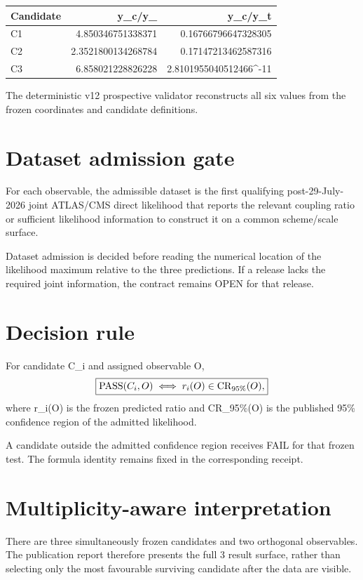 \documentclass[11pt,a4paper,twoside]{book}
\def\({}%
\def\){}%
\theoremstyle{definition}
\begin{document}
\begin{center}
\begin{tabular}{lrr}
\toprule
Candidate & \(y_c/y_\mu\) & \(y_c/y_t\)\\
\midrule
C1 & 4.850346751338371 & 0.16766796647328305\\
C2 & 2.3521800134268784 & 0.17147213462587316\\
C3 & 6.858021228826228 & \(2.8101955040512466\times10^{-11}\)\\
\bottomrule
\end{tabular}
\end{center}

The deterministic v12 prospective validator reconstructs all six values from
the frozen coordinates and candidate definitions.

\section{Dataset admission gate}

For each observable, the admissible dataset is the first qualifying
post-29-July-2026 joint ATLAS/CMS direct likelihood that reports the relevant
coupling ratio or sufficient likelihood information to construct it on a common
scheme/scale surface.

Dataset admission is decided before reading the numerical location of the
likelihood maximum relative to the three predictions.  If a release lacks the
required joint information, the contract remains OPEN for that release.

\section{Decision rule}

For candidate \(C_i\) and assigned observable \(O\),
\[
\boxed{
\operatorname{PASS}(C_i,O)
\iff
r_i(O)\in{\rm CR}_{95\%}(O),
}
\]
where \(r_i(O)\) is the frozen predicted ratio and
\({\rm CR}_{95\%}(O)\) is the published 95\% confidence region of the admitted
likelihood.

A candidate outside the admitted confidence region receives FAIL for that
frozen test.  The formula identity remains fixed in the corresponding receipt.

\section{Multiplicity-aware interpretation}

There are three simultaneously frozen candidates and two orthogonal observables.
The publication report therefore presents the full \(3\) result surface,
rather than selecting only the most favourable surviving candidate after the
data are visible.
\end{document}
